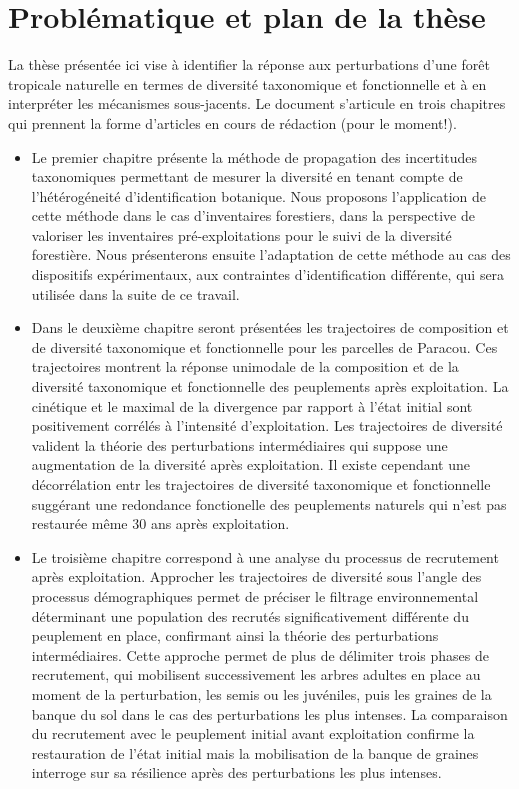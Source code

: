 \documentclass[
  11pt,
  french,
  A4paper,
  extrafontsizes,onecolumn,openright
  ]{memoir}
\begin{document}
\section{Problématique et plan de la
thèse}\label{problematique-et-plan-de-la-these}

La thèse présentée ici vise à identifier la réponse aux perturbations
d'une forêt tropicale naturelle en termes de diversité taxonomique et
fonctionnelle et à en interpréter les mécanismes sous-jacents. Le
document s'articule en trois chapitres qui prennent la forme d'articles
en cours de rédaction (pour le moment!).

\begin{itemize}
\item
  Le premier chapitre présente la méthode de propagation des
  incertitudes taxonomiques permettant de mesurer la diversité en tenant
  compte de l'hétérogéneité d'identification botanique. Nous proposons
  l'application de cette méthode dans le cas d'inventaires forestiers,
  dans la perspective de valoriser les inventaires pré-exploitations
  pour le suivi de la diversité forestière. Nous présenterons ensuite
  l'adaptation de cette méthode au cas des dispositifs expérimentaux,
  aux contraintes d'identification différente, qui sera utilisée dans la
  suite de ce travail.
\item
  Dans le deuxième chapitre seront présentées les trajectoires de
  composition et de diversité taxonomique et fonctionnelle pour les
  parcelles de Paracou. Ces trajectoires montrent la réponse unimodale
  de la composition et de la diversité taxonomique et fonctionnelle des
  peuplements après exploitation. La cinétique et le maximal de la
  divergence par rapport à l'état initial sont positivement corrélés à
  l'intensité d'exploitation. Les trajectoires de diversité valident la
  théorie des perturbations intermédiaires qui suppose une augmentation
  de la diversité après exploitation. Il existe cependant une
  décorrélation entr les trajectoires de diversité taxonomique et
  fonctionnelle suggérant une redondance fonctionelle des peuplements
  naturels qui n'est pas restaurée même 30 ans après exploitation.
\item
  Le troisième chapitre correspond à une analyse du processus de
  recrutement après exploitation. Approcher les trajectoires de
  diversité sous l'angle des processus démographiques permet de préciser
  le filtrage environnemental déterminant une population des recrutés
  significativement différente du peuplement en place, confirmant ainsi
  la théorie des perturbations intermédiaires. Cette approche permet de
  plus de délimiter trois phases de recrutement, qui mobilisent
  successivement les arbres adultes en place au moment de la
  perturbation, les semis ou les juvéniles, puis les graines de la
  banque du sol dans le cas des perturbations les plus intenses. La
  comparaison du recrutement avec le peuplement initial avant
  exploitation confirme la restauration de l'état initial mais la
  mobilisation de la banque de graines interroge sur sa résilience après
  des perturbations les plus intenses.
\end{itemize}
\end{document}
